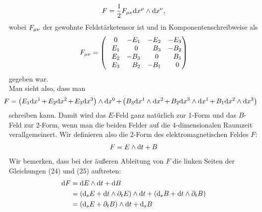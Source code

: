 \begin{align}
F = \frac{1}{2} F_{\mu \nu} \dd x^{\mu} \wedge \dd x^{\nu},
\end{align}
wobei $F_{\mu \nu}$ der gewohnte Feldstärketensor ist und in Komponentenschreibweise als 
\begin{align}
F_{\mu \nu} =
\begin{pmatrix}
\phantom{-}0 & -E_1 & -E_2 & -E_3 \\
\phantom{-}E_1 & \phantom{-}0 & \phantom{-}B_3 & -B_2 \\
\phantom{-}E_2 & -B_3 & \phantom{-}0 & \phantom{-}B_1 \\
\phantom{-}E_3 & \phantom{-}B_2 & -B_1 & \phantom{-}0
\end{pmatrix}
\end{align}
gegeben war. \\
Man sieht also, dass man
\begin{align}
\hspace{-3mm}F = \left( E_1 \dd x^1 \hspace{-0.3mm}+\hspace{-0.3mm}E_2 \dd x^2\hspace{-0.3mm}+\hspace{-0.3mm} E_3 \dd x^3 \right) \w \dd x^0 \hspace{-0.3mm}+\hspace{-0.3mm} \left( B_3 \dd x^1 \w \dd x^2 \hspace{-0.3mm}+\hspace{-0.3mm} B_2 \dd x^3 \w \dd x^1 \hspace{-0.3mm}+\hspace{-0.3mm} B_1 \dd x^2 \w \dd x^3 \right)
\end{align}
schreiben kann. Damit wird das $E$-Feld ganz natürlich zur 1-Form und das $B$-Feld zur 2-Form, wenn man die beiden Felder auf die 4-dimensionalen Raumzeit verallgemeinert. 
Wir definieren also die 2-Form des elektromagnetischen Feldes $F$:
\begin{align}  
F= E \wedge \dd t + B 
\end{align} 
Wir bemerken, dass bei der äußeren Ableitung von $F$ die linken Seiten der Gleichungen (24) und (25) auftreten:
\begin{align}
\dd F &= \dd E \wedge \dd t + \dd B \notag \\
		&= (\dd_s E + \dd t \wedge \partial_t E ) \wedge \dd t + (\dd_s B + \dd t \wedge \partial_t B) \notag \\
		&= (\dd_s E + \partial_t B) \wedge \dd t + \dd_s B
\end{align}

